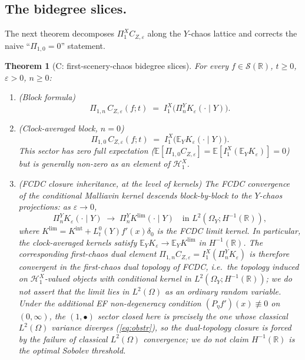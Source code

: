 \documentclass[11pt,reqno]{amsart}
\theoremstyle{plain}
\newtheorem{theorem}{Theorem}[section]
\theoremstyle{definition}
\theoremstyle{remark}
\newcommand{\R}{\mathbb{R}}
\newcommand{\E}{\mathbb{E}}
\newcommand{\Hilb}{\mathcal{H}}
\newcommand{\IBM}{Z}
\newcommand{\Pir}{\Pi}
\begin{document}
\subsection*{The bidegree slices.}
The next theorem decomposes $\Pir_1^X C_{\IBM,\varepsilon}$ along
the $Y$-chaos lattice and corrects the naive ``$\Pir_{1,0}=0$''
statement.

\begin{theorem}[C: first-scenery-chaos bidegree slices]
\label{thm:first-chaos}
For every $f\in\mathscr S(\R)$, $t\ge 0$, $\varepsilon>0$, $n\ge 0$:
\begin{enumerate}
\item (Block formula)
\[
 \Pir_{1,n}\,C_{\IBM,\varepsilon}(f;t)
 \;=\;I_1^X\!\bigl(\Pir_n^Y K_\varepsilon(\cdot\mid Y)\bigr).
\]
\item (Clock-averaged block, $n=0$)
\[
 \Pir_{1,0}\,C_{\IBM,\varepsilon}(f;t)
 \;=\;I_1^X\!\bigl(\E_Y K_\varepsilon(\cdot\mid Y)\bigr).
\]
This sector has zero full expectation
($\E[\Pir_{1,0}C_{\IBM,\varepsilon}]=\E[I_1^X(\E_Y K_\varepsilon)]=0$)
but is generally non-zero as an element of $\Hilb_1^X$.
\item (FCDC closure inheritance, at the level of kernels) The FCDC
convergence~\cite[Thm.\ 5.3]{Fontes-FCDC} of the conditional
Malliavin kernel descends block-by-block to the $Y$-chaos
projections: as $\varepsilon\to 0$,
\[
 \Pir_n^Y K_\varepsilon(\cdot\mid Y)
 \;\longrightarrow\;\Pir_n^Y K^{\mathrm{lim}}(\cdot\mid Y)
\quad\text{in }L^{2}(\Omega_Y;H^{-1}(\R)),
\]
where $K^{\mathrm{lim}}=K^{\mathrm{int}}+L_t^0(Y)f'(x)\delta_0$ is
the FCDC limit kernel. In particular, the clock-averaged kernels
satisfy $\E_Y K_\varepsilon\to\E_Y K^{\mathrm{lim}}$ in $H^{-1}(\R)$.
The corresponding first-chaos dual element
$\Pir_{1,n}C_{\IBM,\varepsilon}=I_1^X(\Pir_n^Y K_\varepsilon)$ is
therefore convergent in the first-chaos dual topology of FCDC, i.e.\
the topology induced on $\Hilb_1^X$-valued objects with conditional
kernel in $L^{2}(\Omega_Y;H^{-1}(\R))$; we do \emph{not} assert that
the limit lies in $L^{2}(\Omega)$ as an ordinary random variable.
Under the additional EF non-degeneracy condition
$(P_\eta f')(x)\not\equiv 0$ on $(0,\infty)$, the $(1,\bullet)$
sector closed here is precisely the one whose classical
$L^{2}(\Omega)$ variance diverges (\eqref{eq:obstr}), so the
dual-topology closure is forced by the failure of classical
$L^{2}(\Omega)$ convergence; we do not claim $H^{-1}(\R)$ is the
optimal Sobolev threshold.
\end{enumerate}
\end{theorem}
\end{document}
